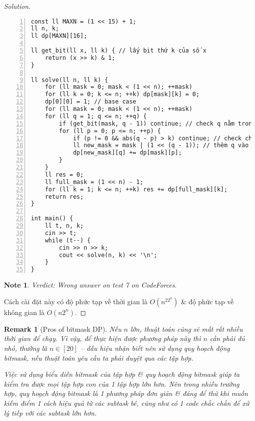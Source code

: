\documentclass{article}
\newtheorem{note}{Note}
\newtheorem{remark}{Remark}
\begin{document}
\begin{proof}[Solution]
\begin{Verbatim}[numbers=left,xleftmargin=5mm]
const ll MAXN = (1 << 15) + 1;
ll n, k;
ll dp[MAXN][16];

ll get_bit(ll x, ll k) { // lấy bit thứ k của số x
    return (x >> k) & 1;
}

ll solve(ll n, ll k) {
    for (ll mask = 0; mask < (1 << n); ++mask)
    for (ll k = 0; k <= n; ++k) dp[mask][k] = 0;
    dp[0][0] = 1; // base case
    for (ll mask = 0; mask < (1 << n); ++mask)
    for (ll q = 1; q <= n; ++q) {
        if (get_bit(mask, q - 1)) continue; // check q nằm trong tập hợp (biểu diễn bằng mask)
        for (ll p = 0; p <= n; ++p) {
            if (p != 0 && abs(q - p) > k) continue; // check chênh lệch của p & q
            ll new_mask = mask | (1 << (q - 1)); // thêm q vào tập hợp
            dp[new_mask][q] += dp[mask][p];
        }
    }
    ll res = 0;
    ll full_mask = (1 << n) - 1;
    for (ll k = 1; k <= n; ++k) res += dp[full_mask][k];
    return res;
}

int main() {
    ll t, n, k;
    cin >> t;
    while (t--) {
        cin >> n >> k;
        cout << solve(n, k) << '\n';
    }
}
    \end{Verbatim}

    \begin{note}
        {\it Verdict}: Wrong answer on test 7 on CodeForces.
    \end{note}
    Cách cài đặt này có độ phức tạp về thời gian là $O(n^22^n)$ \& độ phức tạp về không gian là $O(n2^n)$.
\end{proof}

\begin{remark}[Pros of bitmask DP]
    Nếu $n$ lớn, thuật toán cũng sẽ mất rất nhiều thời gian để chạy. Vì vậy, để thực hiện được phương pháp này thì $n$ cần phải đủ nhỏ, thường là $n\in[20]$ -- dấu hiệu nhận biết nên sử dụng quy hoạch động bitmask, nếu thuật toán yêu cầu ta phải duyệt qua các tập hợp.

    Việc sử dụng biểu diễn bitmask của tập hợp \& quy hoạch động bitmask giúp ta kiểm tra được mọi tập hợp con của 1 tập hợp lớn hơn. Nên trong nhiều trường hợp, quy hoạch động bitmask là 1 phương pháp đơn giản \& đáng để thử khi muốn kiếm điểm 1 cách hiệu quả từ các subtask bé, cũng như có 1 code chắc chắn để xử lý tiếp với các subtask lớn hơn.
\end{remark}
\end{document}
